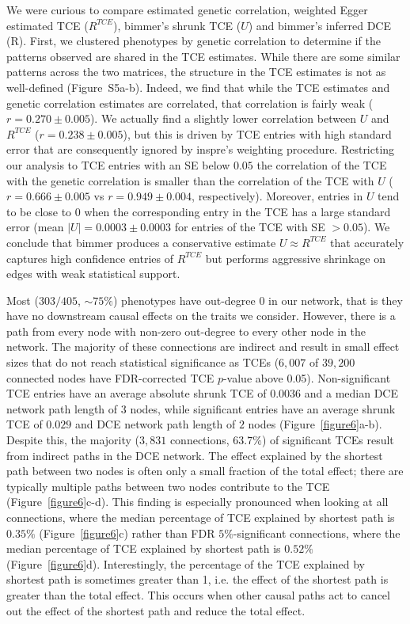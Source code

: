 \documentclass{article}
\begin{document}
We were curious to compare estimated
genetic correlation, weighted Egger estimated TCE ($R^{TCE}$), bimmer's
shrunk TCE ($U$) and bimmer's inferred DCE (R). First, we clustered phenotypes by genetic correlation
to determine if the patterns observed are shared in the TCE estimates.
While there are some similar patterns across the two matrices, the structure in the TCE estimates
is not as well-defined (Figure~S5a-b).
Indeed, we find that while the TCE estimates
and genetic correlation estimates are correlated, that correlation is fairly
weak ($r = 0.270\pm 0.005$). We actually find a slightly lower correlation between
 $U$ and $R^{TCE}$ ($r = 0.238 \pm 0.005$), but this is driven by TCE entries with high 
standard error that are consequently ignored by inspre's weighting procedure.
Restricting our analysis to TCE entries with an
SE below $0.05$ the correlation of the TCE with the genetic correlation is smaller
than the correlation of the TCE with $U$ ($r = 0.666 \pm 0.005$ vs $r = 0.949 \pm 0.004$, respectively).
Moreover, entries in $U$ tend to be close to $0$ when the corresponding
entry in the TCE has a large standard error (mean ${|U|} = 0.0003 \pm 0.0003$ for entries of
the TCE with SE $> 0.05$). We conclude that bimmer produces a conservative
estimate $U \approx R^{TCE}$ that accurately captures high confidence
entries of $R^{TCE}$ but performs aggressive shrinkage on edges with weak statistical support. 

Most ($303/405$, $\sim 75\%$) phenotypes have out-degree $0$ in our network, that is they have no
downstream causal effects on the traits we consider. However, there is a path from every node with non-zero
out-degree to every other node in the network. The majority of these connections
are indirect and result in small effect sizes that do not reach
statistical significance as TCEs
($6,007$ of $39,200$ connected nodes have FDR-corrected TCE $p$-value above 0.05).
Non-significant TCE entries have an average absolute shrunk TCE of $0.0036$
and a median DCE network path length of $3$ nodes, while
significant entries have an average shrunk TCE of $0.029$ and DCE network path length of $2$ nodes
(Figure~\ref{figure6}a-b). Despite this, the majority
 ($3,831$ connections, $63.7\%$) of significant TCEs result from indirect paths in the DCE network.
The effect explained by the shortest path between two nodes is often only a small
fraction of the total effect; there are typically multiple paths
between two nodes contribute to the TCE (Figure~\ref{figure6}c-d). This finding is especially pronounced 
when looking at all connections, where  the median percentage of TCE explained
by shortest path is $0.35\%$ (Figure~\ref{figure6}c) rather than FDR $5\%$-significant connections,
where the  median percentage of TCE explained
by shortest path is $0.52\%$ (Figure~\ref{figure6}d).
Interestingly, the percentage of the TCE explained
by shortest path is sometimes greater than 1, i.e. the
effect of the shortest path is greater than the total effect. This occurs
when other causal paths act to cancel out the effect of the shortest path and reduce the total effect.
\end{document}
